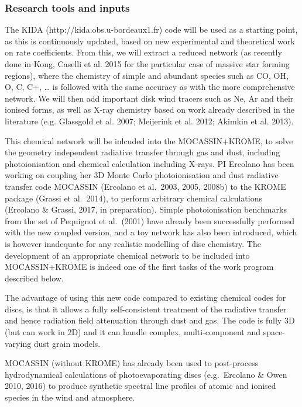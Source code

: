 \documentclass[10pt,fleqn,twoside]{article}
\begin{document}
\subsubsection{Research tools and inputs}

The KIDA (http://kida.obs.u-bordeaux1.fr) code will be used as a
starting point, as this is continuously updated, based on new
experimental and theoretical work on rate coefficients.  From this, we
will extract a reduced network (as recently done in Kong, Caselli et
al. 2015 for the particular case of massive star forming regions),
where the chemistry of simple and abundant species such as CO, OH, O,
C, C+, … is followed with the same accuracy as with the more
comprehensive network.  We will then add important disk wind tracers
such as Ne, Ar and their ionised forms, as well as X-ray chemistry
based on work already described in the literature (e.g. Glassgold et
al. 2007; Meijerink et al. 2012; Akimkin et al. 2013).  

This chemical network will be inlcuded into the MOCASSIN+KROME, to solve the geometry independent radiative transfer through gas  and dust, including photoionisation and chemical calculation
  including X-rays. PI Ercolano has been working on coupling her 3D Monte Carlo photoionisation
and dust radiative transfer code MOCASSIN (Ercolano et al.\ 2003, 2005,
2008b) to the KROME package (Grassi et al.\ 2014), to perform arbitrary
chemical calculations (Ercolano \& Grassi, 2017, in
preparation). Simple photoionisation benchmarks from the set of
Pequignot et al.\ (2001) have already been successfully performed with
the new coupled version, and a toy network has also
been introduced, which is however inadequate for any realistic
modelling of disc chemistry. The development of an appropriate
chemical network to be included into MOCASSIN+KROME is indeed one of
the first tasks of the work program described below.

The advantage of using this new code compared to existing chemical
codes for discs, is that it allows a fully self-consistent treatment
of the radiative transfer and hence radiation field attenuation
through dust and gas. The code is fully 3D (but can work in 2D) and it
can handle complex, multi-component and space-varying dust grain models. 

MOCASSIN (without KROME) has already been used to post-process
hydrodynamical calculations of photoevaporating discs (e.g.\ Ercolano
\& Owen 2010, 2016) to produce synthetic spectral line profiles of
atomic and ionised species in the wind and atmosphere. 
\end{document}
